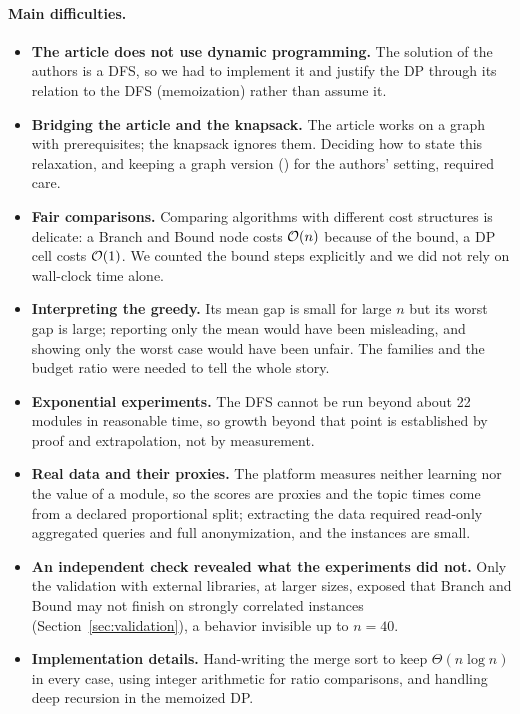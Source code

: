 \paragraph{Main difficulties.}
\begin{itemize}[leftmargin=1.4em,itemsep=2pt]
\item \textbf{The article does not use dynamic programming.} The solution of the authors is a DFS, so we had to implement it and justify the DP through its relation to the DFS (memoization) rather than assume it.
\item \textbf{Bridging the article and the knapsack.} The article works on a graph with prerequisites; the knapsack ignores them. Deciding how to state this relaxation, and keeping a graph version () for the authors' setting, required care.
\item \textbf{Fair comparisons.} Comparing algorithms with different cost structures is delicate: a Branch and Bound node costs $\mathcal{O}(n)$ because of the bound, a DP cell costs $\mathcal{O}(1)$. We counted the bound steps explicitly and we did not rely on wall-clock time alone.
\item \textbf{Interpreting the greedy.} Its mean gap is small for large $n$ but its worst gap is large; reporting only the mean would have been misleading, and showing only the worst case would have been unfair. The families and the budget ratio were needed to tell the whole story.
\item \textbf{Exponential experiments.} The DFS cannot be run beyond about 22 modules in reasonable time, so growth beyond that point is established by proof and extrapolation, not by measurement.
\item \textbf{Real data and their proxies.} The platform measures neither learning nor the value of a module, so the scores are proxies and the topic times come from a declared proportional split; extracting the data required read-only aggregated queries and full anonymization, and the instances are small.
\item \textbf{An independent check revealed what the experiments did not.} Only the validation with external libraries, at larger sizes, exposed that Branch and Bound may not finish on strongly correlated instances (Section~\ref{sec:validation}), a behavior invisible up to $n=40$.
\item \textbf{Implementation details.} Hand-writing the merge sort to keep $\Theta(n\log n)$ in every case, using integer arithmetic for ratio comparisons, and handling deep recursion in the memoized DP.
\end{itemize}

